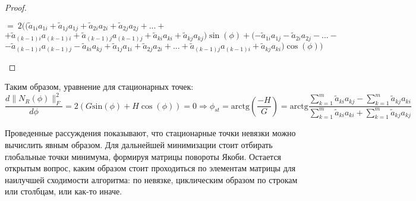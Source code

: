\begin{proof}
\begin{itemize}
\begin{center}
        $=~2((\tilde{a}_{1i} {a}_{1i} + \tilde{a}_{1j} {a}_{1j} + \tilde{a}_{2i} {a}_{2i} + \tilde{a}_{2j} {a}_{2j} + ... + $ \newline$ + \tilde{a}_{(k-1)i}{a}_{(k-1)i} + \tilde{a}_{(k-1)j}{a}_{(k-1)j} + \tilde{a}_{ki}{a}_{ki} + \tilde{a}_{kj}{a}_{kj}) \sin{\left(\phi \right)} + (-\tilde{a}_{1i} {a}_{1j} - \tilde{a}_{2i} {a}_{2j} -... -$\newline$  -\tilde{a}_{(k-1)i} {a}_{(k-1)j} - \tilde{a}_{ki} {a}_{kj} + \tilde{a}_{1j} {a}_{1i} +  \tilde{a}_{2j} {a}_{2i} + ... + \tilde{a}_{(k-1)j} {a}_{(k-1)i} + \tilde{a}_{kj} {a}_{ki}) \cos{\left(\phi \right))}$
    \end{center}
\end{itemize}
\end{proof}

Таким образом, уравнение для стационарных точек:
\begin{equation} \label{Analytic solution for angle, right rotation}
\frac{d\|N_R(\phi) \|^2_F}{d\phi} = 2(G\mathrm{sin}(\phi) + H\cos(\phi)) = 0 \Rightarrow \phi_{st} = \mathrm{arctg}(\frac{-H}{G}) = \mathrm{arctg}{\frac{\sum_{k = 1}^m\tilde{a}_{ki}a_{kj} - \sum_{k = 1}^m\tilde{a}_{kj}a_{ki}}{\sum_{k = 1}^m\tilde{a}_{ki}a_{ki} + \sum^m_{k=1}\tilde{a}_{kj}a_{kj}}}
\end{equation}

Проведенные рассуждения показывают, что стационарные точки невязки можно вычислить явным образом. Для дальнейшей минимизации стоит отбирать глобальные точки минимума, формируя матрицы повороты Якоби. Остается открытым вопрос, каким образом стоит проходиться по элементам матрицы для наилучшей сходимости алгоритма: по невязке, циклическим образом по строкам или столбцам, или как-то иначе. 





